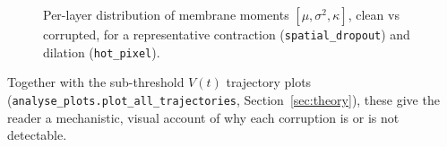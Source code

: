 \begin{figure}[t]
  \centering
  \caption{Per-layer distribution of membrane moments $[\mu,\sigma^2,\kappa]$, clean vs
  corrupted, for a representative contraction (\texttt{spatial\_dropout}) and dilation
  (\texttt{hot\_pixel}).}
  \label{fig:perlayer}
\end{figure}

Together with the sub-threshold $V(t)$ trajectory plots
(\texttt{analyse\_plots.plot\_all\_trajectories}, Section~\ref{sec:theory}), these give the
reader a mechanistic, visual account of why each corruption is or is not detectable.
